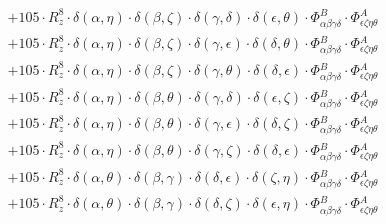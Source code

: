 \documentclass{article}
\begin{document}
\begin{equation}
\begin{array}{c}
 \\[0.2em] 		 + 105 \cdot R_{z}^{8} \cdot \delta{}\left(\alpha{}, \eta{}\right) \cdot \delta{}\left(\beta{}, \zeta{}\right) \cdot \delta{}\left(\gamma{}, \delta{}\right) \cdot \delta{}\left(\epsilon{}, \theta{}\right) \cdot \Phi{}^{B}_{\alpha{}\beta{}\gamma{}\delta{}} \cdot \Phi{}^{A}_{\epsilon{}\zeta{}\eta{}\theta{}} 
 \\[0.2em] 		 + 105 \cdot R_{z}^{8} \cdot \delta{}\left(\alpha{}, \eta{}\right) \cdot \delta{}\left(\beta{}, \zeta{}\right) \cdot \delta{}\left(\gamma{}, \epsilon{}\right) \cdot \delta{}\left(\delta{}, \theta{}\right) \cdot \Phi{}^{B}_{\alpha{}\beta{}\gamma{}\delta{}} \cdot \Phi{}^{A}_{\epsilon{}\zeta{}\eta{}\theta{}} 
 \\[0.2em] 		 + 105 \cdot R_{z}^{8} \cdot \delta{}\left(\alpha{}, \eta{}\right) \cdot \delta{}\left(\beta{}, \zeta{}\right) \cdot \delta{}\left(\gamma{}, \theta{}\right) \cdot \delta{}\left(\delta{}, \epsilon{}\right) \cdot \Phi{}^{B}_{\alpha{}\beta{}\gamma{}\delta{}} \cdot \Phi{}^{A}_{\epsilon{}\zeta{}\eta{}\theta{}} 
 \\[0.2em] 		 + 105 \cdot R_{z}^{8} \cdot \delta{}\left(\alpha{}, \eta{}\right) \cdot \delta{}\left(\beta{}, \theta{}\right) \cdot \delta{}\left(\gamma{}, \delta{}\right) \cdot \delta{}\left(\epsilon{}, \zeta{}\right) \cdot \Phi{}^{B}_{\alpha{}\beta{}\gamma{}\delta{}} \cdot \Phi{}^{A}_{\epsilon{}\zeta{}\eta{}\theta{}} 
 \\[0.2em] 		 + 105 \cdot R_{z}^{8} \cdot \delta{}\left(\alpha{}, \eta{}\right) \cdot \delta{}\left(\beta{}, \theta{}\right) \cdot \delta{}\left(\gamma{}, \epsilon{}\right) \cdot \delta{}\left(\delta{}, \zeta{}\right) \cdot \Phi{}^{B}_{\alpha{}\beta{}\gamma{}\delta{}} \cdot \Phi{}^{A}_{\epsilon{}\zeta{}\eta{}\theta{}} 
 \\[0.2em] 		 + 105 \cdot R_{z}^{8} \cdot \delta{}\left(\alpha{}, \eta{}\right) \cdot \delta{}\left(\beta{}, \theta{}\right) \cdot \delta{}\left(\gamma{}, \zeta{}\right) \cdot \delta{}\left(\delta{}, \epsilon{}\right) \cdot \Phi{}^{B}_{\alpha{}\beta{}\gamma{}\delta{}} \cdot \Phi{}^{A}_{\epsilon{}\zeta{}\eta{}\theta{}} 
 \\[0.2em] 		 + 105 \cdot R_{z}^{8} \cdot \delta{}\left(\alpha{}, \theta{}\right) \cdot \delta{}\left(\beta{}, \gamma{}\right) \cdot \delta{}\left(\delta{}, \epsilon{}\right) \cdot \delta{}\left(\zeta{}, \eta{}\right) \cdot \Phi{}^{B}_{\alpha{}\beta{}\gamma{}\delta{}} \cdot \Phi{}^{A}_{\epsilon{}\zeta{}\eta{}\theta{}} 
 \\[0.2em] 		 + 105 \cdot R_{z}^{8} \cdot \delta{}\left(\alpha{}, \theta{}\right) \cdot \delta{}\left(\beta{}, \gamma{}\right) \cdot \delta{}\left(\delta{}, \zeta{}\right) \cdot \delta{}\left(\epsilon{}, \eta{}\right) \cdot \Phi{}^{B}_{\alpha{}\beta{}\gamma{}\delta{}} \cdot \Phi{}^{A}_{\epsilon{}\zeta{}\eta{}\theta{}} 

\end{array}
\end{equation}
\end{document}
